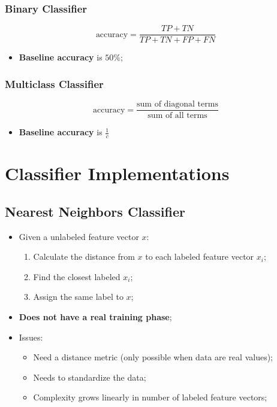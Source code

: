     \subsubsection{Binary Classifier}
    
      \begin{equation}
        \text{accuracy} = \frac{ TP + TN }{ TP + TN + FP + FN }
      \end{equation}
      
      \begin{itemize}
        \item \textbf{Baseline accuracy} is $ 50 \% $;
      \end{itemize}
    
    \subsubsection{Multiclass Classifier}
    
      \begin{equation}
        \text{accuracy} = \frac{ \text{sum of diagonal terms} }{ \text{sum of all terms} }
      \end{equation}
      
      \begin{itemize}
        \item \textbf{Baseline accuracy} is $ \frac{1}{c} $
      \end{itemize}
    
\section{Classifier Implementations}

  \subsection{Nearest Neighbors Classifier}
  
    \begin{itemize}
      \item Given a unlabeled feature vector $ x $:
      \begin{enumerate}
        \item Calculate the distance from $ x $ to each labeled feature vector $ x_{i} $;
        \item Find the closest labeled $ x_{i} $;
        \item Assign the same label to $ x $;
      \end{enumerate}
      
      \item \textbf{Does not have a real training phase};
      \item Issues:
      \begin{itemize}
        \item Need a distance metric (only possible when data are real values);
        \item Needs to standardize the data;
        \item Complexity grows linearly in number of labeled feature vectors;
      \end{itemize}
    \end{itemize}
    
